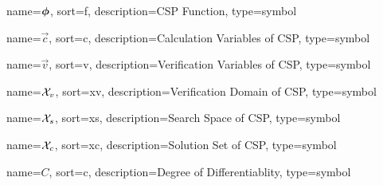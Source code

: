 	{%
		name=\ensuremath{\vecfunc{\phi}},
		sort=f,
		description=CSP Function,
		type=symbol
	}
	\newcommand{\cspfunc}{\gls{sym:cspfunc}}

	{%
		name=\ensuremath{\vec{c}},
		sort=c,
		description=Calculation Variables of CSP,
		type=symbol
	}
	\newcommand{\calcvars}{\gls{sym:calcvars}}

	{%
		name=\ensuremath{\vec{v}},
		sort=v,
		description=Verification Variables of CSP,
		type=symbol
	}
	\newcommand{\vervars}{\gls{sym:vervars}}

	{%
		name=\ensuremath{\set{X}_{v}},
		sort=xv,
		description=Verification Domain of CSP,
		type=symbol
	}
	\newcommand{\verdomain}{\gls{sym:verdomain}}

	{%
		name=\ensuremath{\set{X}_{s}},
		sort=xs,
		description=Search Space of CSP,
		type=symbol
	}
	\newcommand{\cspsearchspace}{\gls{sym:cspsearchspace}}

	{%
		name=\ensuremath{\set{X}_{c}},
		sort=xc,
		description=Solution Set of CSP,
		type=symbol
	}
	\newcommand{\cspsolutionset}{\gls{sym:cspsolutionset}}

	{%
		name=\ensuremath{C},
		sort=c,
		description=Degree of Differentiablity,
		type=symbol
	}
	\newcommand{\contdegbare}{\ensuremath{\gls{sym:contdegbare}}}
	\newcommand{\contdeg}[1]{\ensuremath{\contdegbare^{#1}}}


